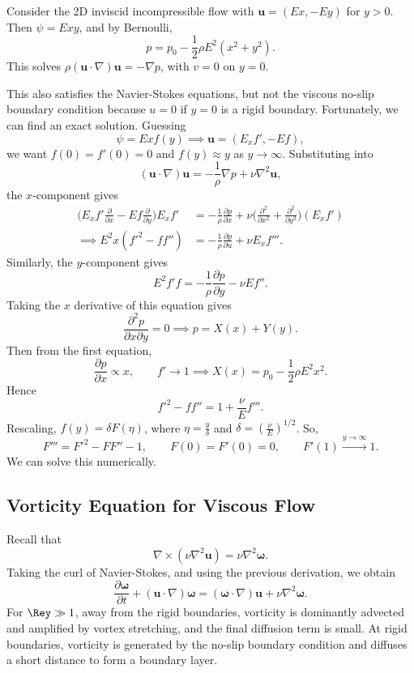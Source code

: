 \documentclass[12pt]{article}
\begin{document}
Consider the 2D inviscid incompressible flow with $\mathbf{u} = (Ex, -Ey)$ for $y > 0$. Then $\psi = Exy$, and by Bernoulli,
\[
p = p_0 - \frac{1}{2} \rho E^2(x^2 + y^2)
.\]
This solves $\rho (\mathbf{u} \cdot \nabla)\mathbf{u} = - \nabla p$, with $v = 0$ on $y = 0$.

This also satisfies the Navier-Stokes equations, but not the viscous no-slip boundary condition because $u = 0$ if $y = 0$ is a rigid boundary. Fortunately, we can find an exact solution. Guessing
\[
\psi = Ex f(y) \implies \mathbf{u} = (E_x f', -Ef)
,\]
we want $f(0) = f'(0) = 0$ and $f(y) \approx y$ as $y \to \infty$. Substituting into
\[
	(\mathbf{u} \cdot \nabla)\mathbf{u} = - \frac{1}{\rho} \nabla p + \nu \nabla^2 \mathbf{u}
,\]
the $x$-component gives
\begin{align*}
	\biggl(E_x f' \frac{\partial}{\partial x} - E f \frac{\partial}{\partial y}\biggr) E_x f' &= - \frac{1}{\rho} \frac{\partial p}{\partial x} + \nu \biggl( \frac{\partial^2}{\partial x^2} + \frac{\partial^2}{\partial y^2} \biggr) (E_x f') \\
	\implies E^2 x(f'^2 - ff'') &= - \frac{1}{\rho} \frac{\partial p}{\partial u} + \nu E_x f'''.
\end{align*}
Similarly, the $y$-component gives
\[
	E^2 f' f = - \frac{1}{\rho} \frac{\partial p}{\partial y} - \nu E f''
.\]
Taking the $x$ derivative of this equation gives
\[
\frac{\partial^2 p}{\partial x \partial y} = 0 \implies p = X(x) + Y(y)
.\]
Then from the first equation,
\[
\frac{\partial p}{\partial x} \propto x, \qquad f' \to 1 \implies X(x) = p_0 - \frac{1}{2} \rho E^2 x^2
.\]
Hence
\[
f'^2 - ff'' = 1 + \frac{\nu}{E} f'''
.\]
Rescaling, $f(y) = \delta F(\eta)$, where $\eta = \frac{y}{\delta}$ and $\delta = (\frac{\nu}{E})^{1/2}$. So,
\[
	F''' = F'^2 - FF'' - 1, \qquad F(0) = F'(0) = 0, \qquad F'(1) \overset{y \to \infty}{\to} 1
.\]
We can solve this numerically.

\subsection{Vorticity Equation for Viscous Flow}
\label{sub:vorticity_equation_for_viscous_flow}

Recall that
\[
\nabla \times (\nu \nabla^2 \mathbf{u}) = \nu \nabla^2 \bm{\omega}.
\]
Taking the curl of Navier-Stokes, and using the previous derivation, we obtain
\[
\frac{\partial \bm{\omega}}{\partial t} + (\mathbf{u} \cdot \nabla) \bm{\omega} = (\bm{\omega} \cdot \nabla) \mathbf{u} + \nu \nabla^2 \bm{\omega}.
\]
For $\Rey \gg 1$, away from the rigid boundaries, vorticity is dominantly advected and amplified by vortex stretching, and the final diffusion term is small. At rigid boundaries, vorticity is generated by the no-slip boundary condition and diffuses a short distance to form a boundary layer.
\end{document}
